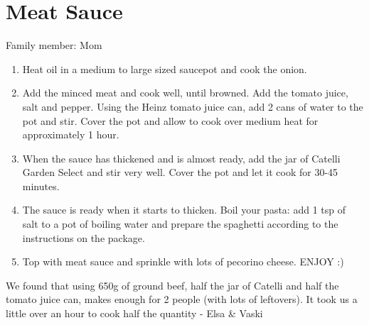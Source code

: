 \chapter{Meat Sauce}
\label{ch:meatsauce}


Family member: Mom


\begin{enumerate}
    \item Heat oil in a medium to large sized saucepot and cook the onion.
    \item Add the minced meat and cook well, until browned. Add the tomato juice, salt and pepper. Using the Heinz tomato juice can, add 2 cans of water to the pot and stir. Cover the pot and allow to cook over medium heat for approximately 1 hour.
    \item When the sauce has thickened and is almost ready, add the jar of Catelli Garden Select and stir very well. Cover the pot and let it cook for 30-45 minutes.
    \item The sauce is ready when it starts to thicken. Boil your pasta: add 1 tsp of salt to a pot of boiling water and prepare the spaghetti according to the instructions on the package.
    \item Top with meat sauce and sprinkle with lots of pecorino cheese. ENJOY :)
\end{enumerate}

We found that using 650g of ground beef, half the jar of Catelli and half the tomato juice can, makes enough for 2 people (with lots of leftovers). It took us a little over an hour to cook half the quantity - Elsa \& Vaski


